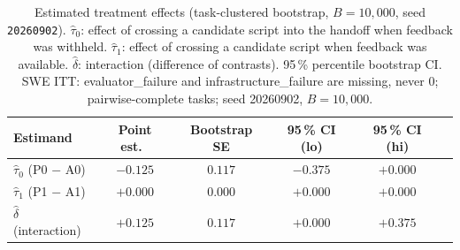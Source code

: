 \begin{table}[ht]
\centering
\caption{Estimated treatment effects (task-clustered bootstrap, $B=10,000$, seed \texttt{20260902}).
  $\hat\tau_0$: effect of crossing a candidate script into the handoff when feedback was withheld.
  $\hat\tau_1$: effect of crossing a candidate script when feedback was available.
  $\hat\delta$: interaction (difference of contrasts).
  95\,\% percentile bootstrap CI.
  SWE ITT: evaluator_failure and infrastructure_failure are missing, never 0; pairwise-complete tasks; seed 20260902, $B=10{,}000$.
}
\label{tab:effects}
\begin{tabular}{lccccc}
\toprule
Estimand & Point est.\ & Bootstrap SE & 95\,\% CI (lo) & 95\,\% CI (hi) \\
\midrule
  $\hat\tau_0$ (P0 $-$ A0) & $-0.125$ & $0.117$ & $-0.375$ & $+0.000$ \\
  $\hat\tau_1$ (P1 $-$ A1) & $+0.000$ & $0.000$ & $+0.000$ & $+0.000$ \\
  $\hat\delta$ (interaction) & $+0.125$ & $0.117$ & $+0.000$ & $+0.375$ \\
\bottomrule
\end{tabular}
\end{table}
